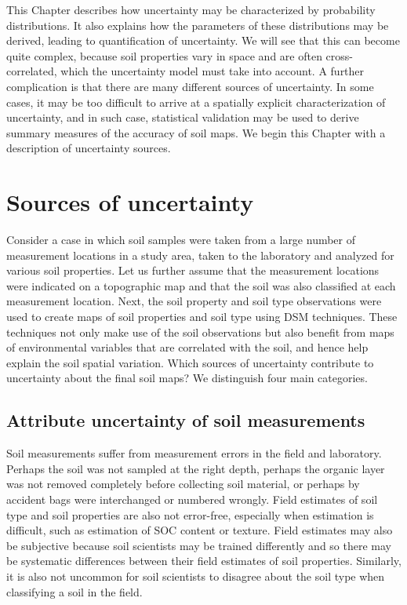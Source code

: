 \documentclass[10pt,b5paper,]{book}
\theoremstyle{definition}
\theoremstyle{definition}
\theoremstyle{definition}
\theoremstyle{remark}
\begin{document}
This Chapter describes how uncertainty may be characterized by
probability distributions. It also explains how the parameters of these
distributions may be derived, leading to quantification of uncertainty.
We will see that this can become quite complex, because soil properties
vary in space and are often cross-correlated, which the uncertainty
model must take into account. A further complication is that there are
many different sources of uncertainty. In some cases, it may be too
difficult to arrive at a spatially explicit characterization of
uncertainty, and in such case, statistical validation may be used to
derive summary measures of the accuracy of soil maps. We begin this
Chapter with a description of uncertainty sources.

\hypertarget{sourcesuncert}{%
\section{Sources of uncertainty}\label{sourcesuncert}}

Consider a case in which soil samples were taken from a large number of
measurement locations in a study area, taken to the laboratory and
analyzed for various soil properties. Let us further assume that the
measurement locations were indicated on a topographic map and that the
soil was also classified at each measurement location. Next, the soil
property and soil type observations were used to create maps of soil
properties and soil type using DSM techniques. These techniques not only
make use of the soil observations but also benefit from maps of
environmental variables that are correlated with the soil, and hence
help explain the soil spatial variation. Which sources of uncertainty
contribute to uncertainty about the final soil maps? We distinguish four
main categories.

\hypertarget{attribute-uncertainty-of-soil-measurements}{%
\subsection{Attribute uncertainty of soil
measurements}\label{attribute-uncertainty-of-soil-measurements}}

Soil measurements suffer from measurement errors in the field and
laboratory. Perhaps the soil was not sampled at the right depth, perhaps
the organic layer was not removed completely before collecting soil
material, or perhaps by accident bags were interchanged or numbered
wrongly. Field estimates of soil type and soil properties are also not
error-free, especially when estimation is difficult, such as estimation
of SOC content or texture. Field estimates may also be subjective
because soil scientists may be trained differently and so there may be
systematic differences between their field estimates of soil properties.
Similarly, it is also not uncommon for soil scientists to disagree about
the soil type when classifying a soil in the field.
\end{document}
